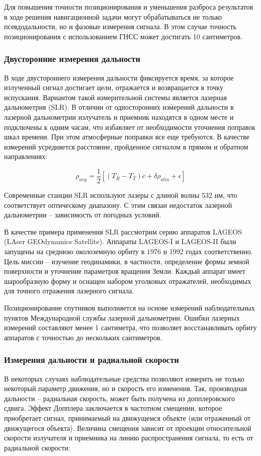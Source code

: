Для повышения точности позиционирования и уменьшения разброса результатов
в ходе решения навигационной задачи могут обрабатываться не только псевдодальности,
но и фазовые измерения сигнала. 
В этом случае точность позиционирования с использованием ГНСС может достигать 10 сантиметров.

\subsubsection{Двусторонние измерения дальности}
В ходе двустороннего измерения дальности фиксируется время, за которое излученный сигнал
достигает цели, отражается и возвращается в точку испускания. 
Вариантом такой измерительной системы является лазерная дальнометрия (SLR).
В отличии от односторонних измерений дальности в лазерной дальнометрии излучатель и приемник
находятся в одном месте и подключены к одним часам, что избавляет от необходимости уточнения поправок шкал времени.
При этом атмосферные поправки все еще требуются. 
В качестве измерений усредняется расстояние, пройденное сигналом в прямом и обратном направлениях:

\begin{equation*}
    \rho_{avg} = \frac{1}{2} \left[ 
        \left(T_{R} - T_{T}\right) c + \delta \rho_{atm} + \epsilon \right]
\end{equation*}

Современные станции SLR используют лазеры с длиной волны 532 нм, что соответствует оптическому диапазону.
С этим связан недостаток лазерной дальнометрии -- зависимость от погодных условий.

В качестве примера применения SLR рассмотрим серию аппаратов LAGEOS (LAser GEOdynamics Satellite).
Аппараты LAGEOS-I и LAGEOS-II были запущены на среднюю околоземную орбиту в 1976 и 1992 годах соответственно.
Цель миссии -- изучение геодинамики, в частности, определение формы земной поверхности и уточнение параметров вращения Земли. 
Каждый аппарат имеет шарообразную форму и оснащен набором уголковых отражателей, необходимых
для точного отражения лазерного сигнала.

Позиционирование спутников выполняется на основе измерений наблюдательных пунктов Международной службы лазерной дальнометрии.
Ошибки лазерных измерений составляют менее 1 сантиметра, что позволяет восстанавливать орбиту аппаратов с точностью до нескольких сантиметров.

\subsubsection{Измерения дальности и радиальной скорости}
В некоторых случаях наблюдательные средства позволяют измерить не только
некоторый параметр движения, но и скорость его изменения. 
Так, производная дальности -- радиальная скорость, может быть получена из допплеровского сдвига.
Эффект Допплера заключается в частотном смещении, которое приобретает сигнал, принимаемый на движущемся объекте (или отраженный от движущегося объекта).
Величина смещения зависит от проекции относительной скорости излучателя и приемника на линию распространения сигнала,
то есть от радиальной скорости:

